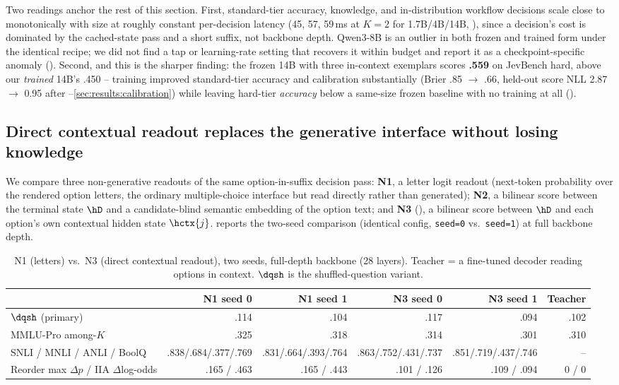 Two readings anchor the rest of this section. First, standard-tier accuracy, knowledge, and in-distribution
workflow decisions scale close to monotonically with size at roughly constant per-decision latency (45,
57, 59\,ms at $K{=}2$ for 1.7B/4B/14B, ), since a decision's cost is dominated by
the cached-state pass and a short suffix, not backbone depth. Qwen3-8B is an outlier in both frozen and
trained form under the identical recipe; we did not find a tap or learning-rate setting that recovers it
within budget and report it as a checkpoint-specific anomaly (). Second, and this is
the sharper finding: the frozen 14B with three in-context exemplars scores \textbf{.559} on JevBench hard,
above our \emph{trained} 14B's .450 -- training improved standard-tier accuracy and calibration
substantially (Brier .85 $\to$ .66, held-out score NLL 2.87 $\to$ 0.95 after --\ref{sec:results:calibration})
while leaving hard-tier \emph{accuracy} below a same-size frozen baseline with no training at all
().

\subsection{Direct contextual readout replaces the generative interface without losing knowledge}
\label{sec:results:readout}

We compare three non-generative readouts of the same option-in-suffix decision pass: \textbf{N1}, a letter
logit readout (next-token probability over the rendered option letters, the ordinary multiple-choice
interface but read directly rather than generated); \textbf{N2}, a bilinear score between the terminal
state $\hD$ and a candidate-blind semantic embedding of the option text; and \textbf{N3}
(), a bilinear score between $\hD$ and each option's own contextual hidden state
$\hctx{j}$.  reports the two-seed comparison (identical config, \texttt{seed=0} vs.\
\texttt{seed=1}) at full backbone depth.

\begin{table}[t]
  \centering
  \caption{N1 (letters) vs.\ N3 (direct contextual readout), two seeds, full-depth backbone (28 layers).
  Teacher = a fine-tuned decoder reading options in context. $\dqsh$ is the shuffled-question variant.}
  \label{tab:n1n3}
  \small
  \begin{tabular}{lrrrrr}
    \toprule
    & N1 seed 0 & N1 seed 1 & N3 seed 0 & N3 seed 1 & Teacher \\
    \midrule
    $\dqsh$ (primary) & .114 & .104 & .117 & .094 & .102 \\
    MMLU-Pro among-$K$ & .325 & .318 & .314 & .301 & .310 \\
    SNLI / MNLI / ANLI / BoolQ & .838/.684/.377/.769 & .831/.664/.393/.764 & .863/.752/.431/.737 & .851/.719/.437/.746 & -- \\
    Reorder max $\Delta p$ / IIA $\Delta$log-odds & .165 / .463 & .165 / .443 & .101 / .126 & .109 / .094 & 0 / 0 \\
    \bottomrule
  \end{tabular}
\end{table}

